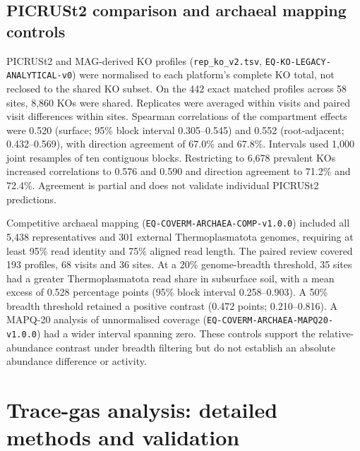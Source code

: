 \subsection{PICRUSt2 comparison and archaeal mapping controls}
PICRUSt2 and MAG-derived KO profiles (\texttt{rep\_ko\_v2.tsv}, \texttt{EQ-KO-\allowbreak LEGACY-\allowbreak ANALYTICAL-\allowbreak v0}) were normalised to each platform's complete KO total, not reclosed to the shared KO subset. On the 442 exact matched profiles across 58 sites, 8,860 KOs were shared. Replicates were averaged within visits and paired visit differences within sites. Spearman correlations of the compartment effects were 0.520 (surface; 95\% block interval 0.305--0.545) and 0.552 (root-adjacent; 0.432--0.569), with direction agreement of 67.0\% and 67.8\%. Intervals used 1,000 joint resamples of ten contiguous blocks. Restricting to 6,678 prevalent KOs increased correlations to 0.576 and 0.590 and direction agreement to 71.2\% and 72.4\%. Agreement is partial and does not validate individual PICRUSt2 predictions.

Competitive archaeal mapping (\texttt{EQ-COVERM-\allowbreak ARCHAEA-\allowbreak COMP-\allowbreak v1.0.0}) included all 5,438 representatives and 301 external Thermoplasmatota genomes, requiring at least 95\% read identity and 75\% aligned read length. The paired review covered 193 profiles, 68 visits and 36 sites. At a 20\% genome-breadth threshold, 35 sites had a greater Thermoplasmatota read share in subsurface soil, with a mean excess of 0.528 percentage points (95\% block interval 0.258--0.903). A 50\% breadth threshold retained a positive contrast (0.472 points; 0.210--0.816). A MAPQ-20 analysis of unnormalised coverage (\texttt{EQ-COVERM-\allowbreak ARCHAEA-\allowbreak MAPQ20-\allowbreak v1.0.0}) had a wider interval spanning zero. These controls support the relative-abundance contrast under breadth filtering but do not establish an absolute abundance difference or activity.

\clearpage
\section{Trace-gas analysis: detailed methods and validation}\label{sup:loa_methods}\label{sup:loa}


